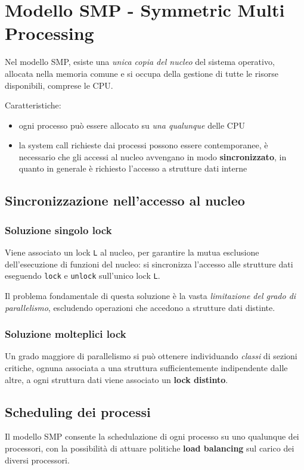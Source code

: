 \section{Modello SMP - Symmetric Multi Processing}
Nel modello SMP, esiste una \textit{unica copia del nucleo} del sistema operativo, allocata nella memoria comune e si occupa della gestione di tutte le risorse disponibili, comprese le CPU.

Caratteristiche:
\begin{itemize}
    \item ogni processo può essere allocato su \textit{una qualunque} delle CPU
    \item la system call richieste dai processi possono essere contemporanee, è necessario che gli accessi al nucleo avvengano in modo \textbf{sincronizzato}, in quanto in generale è richiesto l'accesso a strutture dati interne
\end{itemize}

\subsection{Sincronizzazione nell'accesso al nucleo}

\subsubsection{Soluzione singolo lock}
Viene associato un lock \texttt{L} al nucleo, per garantire la mutua esclusione dell'esecuzione di funzioni del nucleo: si sincronizza l'accesso alle strutture dati eseguendo \texttt{lock} e \texttt{unlock} sull'unico lock \texttt{L}.

Il problema fondamentale di questa soluzione è la vasta \textit{limitazione del grado di parallelismo}, escludendo operazioni che accedono a strutture dati distinte.

\subsubsection{Soluzione molteplici lock}
Un grado maggiore di parallelismo si può ottenere individuando \textit{classi} di sezioni critiche, ognuna associata a una struttura sufficientemente indipendente dalle altre, a ogni struttura dati viene associato un \textbf{lock distinto}.

\subsection{Scheduling dei processi}
Il modello SMP consente la schedulazione di ogni processo su uno qualunque dei processori, con la possibilità di attuare politiche \textbf{load balancing} sul carico dei diversi processori.

